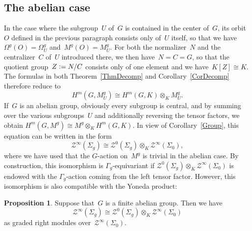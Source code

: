 \documentclass[12pt]{article}
\theoremstyle{definition}
\newtheorem{Proposition}[Satz]{Proposition}
\theoremstyle{break}
\renewcommand{\1}{\mathbbm{1}}
\newcommand{\TFT}{\mathcal{Z}}
\newcommand{\ot}{\mathbin{\otimes}}
\newcommand{\deq}{\vcentcolon =}
\begin{document}
\subsection{The abelian case} \label{Abel}
In the case where the subgroup~$U$ of~$G$ is contained in the center of~$G$, its orbit~$O$ defined in the previous paragraph consists only of~$U$ itself, so that we have
\mbox{$\Omega^g(O) = \Omega^g_U$} and~$M^g(O) = M^g_U$. For both the normalizer~$N$ and the centralizer~$C$ of~$U$ introduced there, we then have~$N=C=G$, so that the
quotient group~$Z \deq N/C$ consists only of one element and we have~$K[Z] \cong K$. The formulas in both Theorem~\ref{ThmDecomp} and Corollary~\ref{CorDecomp} therefore reduce to
\[H^m(G,M_U^{g}) \cong H^m(G,K) \ot_{K} M_U^{g}.\]
If~$G$ is an abelian group, obviously every subgroup is central, and by summing over the various subgroups~$U$ and additionally reversing the tensor factors, we obtain
$H^m(G,M^{g}) \cong M^{g} \ot_{K} H^m(G,K)$. In view of Corollary~\ref{Group}, this equation can be written in the form
\[\TFT^\infty(\Sigma_g) \cong \TFT^0(\Sigma_g) \ot_K \TFT^\infty(\Sigma_0),\]
where we have used that the $G$-action on~$M^{g}$ is trivial in the abelian case. By construction, this isomorphism is $\Gamma_g$-equivariant if
$\TFT^0(\Sigma_g) \ot_K \TFT^\infty(\Sigma_0)$ is endowed with the $\Gamma_g$-action coming from the left tensor factor. However, this isomorphism is also compatible with the Yoneda product:
\begin{Proposition} \label{AbelFreeGen}
Suppose that~$G$ is a finite abelian group. Then we have
\[\TFT^\infty(\Sigma_g) \cong \TFT^0(\Sigma_g) \ot_K \TFT^\infty(\Sigma_0)\]
as graded right modules over~$\TFT^\infty(\Sigma_0)$.
\end{Proposition}
\end{document}
